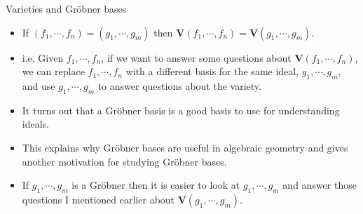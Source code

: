\documentclass[handout]{beamer}
\begin{document}

\begin{frame}{Varieties and Gr\"{o}bner bases}

\begin{itemize}
  \item If $(f_1,\cdots,f_n) = (g_1,\cdots,g_m)$ then $\mathbf{V}(f_1,\cdots,f_n) = \mathbf{V}(g_1,\cdots,g_m)$.
  \item i.e. Given $f_1,\cdots,f_n$, if we want to answer some questions about $\mathbf{V}(f_1,\cdots,f_n)$,
  we can replace $f_1,\cdots,f_n$ with a different basis for the same ideal, $g_1,\cdots,g_m$, and use
  $g_1,\cdots,g_m$ to answer questions about the variety.
  \item It turns out that a Gr\"{o}bner basis is a good basis to use for understanding ideals.
  \item This explains why Gr\"{o}bner bases are useful in algebraic geometry and gives another motivation for studying Gr\"{o}bner bases.
  \item If $g_1,\cdots,g_m$ is a Gr\"{o}bner then it is easier to look at $g_1,\cdots,g_m$ and answer those questions I mentioned earlier
  about $\mathbf{V}(g_1,\cdots,g_m)$.

\end{itemize}
\end{frame}


\end{document}

